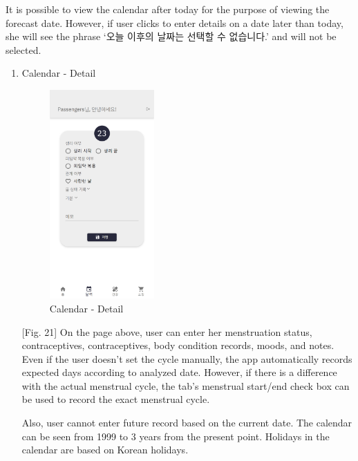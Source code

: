 \documentclass[conference]{IEEEtran}
\begin{document}
\begin{itemize}
    [Fig. 20] It is possible to view the calendar after today for the purpose of viewing the forecast date. However, if user clicks to enter details on a date later than today, she will see the phrase ‘오늘 이후의 날짜는 선택할 수 없습니다.’ and will not be selected.
    
    \begin{enumerate}
    \setlength{\parindent}{2ex}
        \item Calendar - Detail
        
        \begin{figure}[ht]
        \includegraphics[width=4cm, height=8cm, center]{calendar_detail1.png}
        \caption{Calendar - Detail}
        \label{fig21}
        \end{figure}
        
        [Fig. 21] On the page above, user can enter her menstruation status, contraceptives, contraceptives, body condition records, moods, and notes. Even if the user doesn't set the cycle manually, the app automatically records expected days according to analyzed date. However, if there is a difference with the actual menstrual cycle, the tab's menstrual start/end check box can be used to record the exact menstrual cycle. 
        
        Also, user cannot enter future record based on the current date. The calendar can be seen from 1999 to 3 years from the present point. Holidays in the calendar are based on Korean holidays.
        

\end{enumerate}
\end{itemize}
\end{document}
